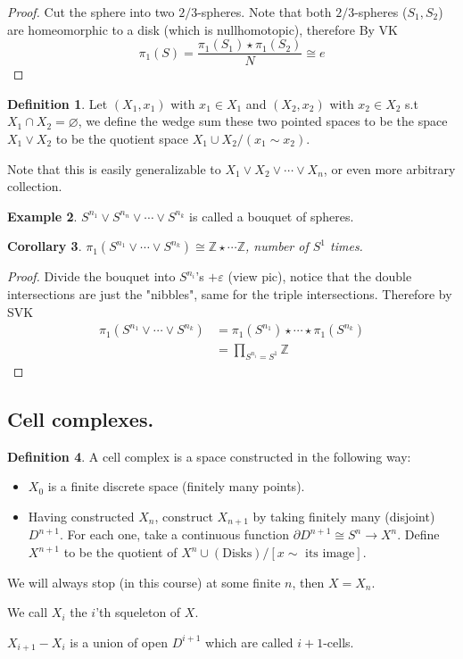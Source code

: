 \documentclass[11pt,a4paper]{article}
\theoremstyle{definition}
\newtheorem{definition}{Definition}[section]
\newtheorem{example}[definition]{Example}
\theoremstyle{plain}
\newtheorem{corollary}[definition]{Corollary}
\theoremstyle{remark}
\newcommand{\Z}{\mathbb{Z}}
\newcommand{\1}{\mathbbm{1}}
\begin{document}
\begin{proof}
    Cut the sphere into two $2/3$-spheres. Note that both $2/3$-spheres ($S_1, S_2$) are homeomorphic to a disk (which is nullhomotopic), therefore By VK 
    $$\pi_1 (S) = \frac{\pi_1(S_1) \star \pi_1(S_2)}{N} \cong e$$
\end{proof}

\begin{definition}
    Let $(X_1,x_1)$ with $x_1 \in X_1$ and $(X_2, x_2)$ with $x_2 \in X_2$ s.t $X_1 \cap X_2 = \varnothing$, we define 
    the wedge sum these two pointed spaces to be the space $X_1 \vee X_2$ to be the quotient space 
    $X_1 \cup X_2 / (x_1 \sim x_2)$. 
    
    Note that this is easily generalizable to $X_1 \vee X_2 \vee \cdots \vee X_n$, or even more arbitrary collection.
\end{definition}

\begin{example}
    $S^{n_1} \vee S^{n_n} \vee \cdots \vee S^{n_k}$ is called a bouquet of spheres. 
\end{example}

\begin{corollary}
    $\pi_1(S^{n_1} \vee \cdots \vee S^{n_k}) \cong \Z \star \cdots \Z$, number of $S^1$ times. 
\end{corollary}

\begin{proof}
    Divide the bouquet into $S^{n_i}$'s $+ \varepsilon$ (view pic), notice that the double intersections are just the "nibbles", same for the triple intersections. Therefore 
    by SVK 
    \begin{align*}
        \pi_1(S^{n_1} \vee \cdots \vee S^{n_k}) &= \pi_1(S^{n_1}) \star \cdots \star \pi_1(S^{n_k}) \\
        &= \prod_{S^{n_i} = S^1} \Z 
    \end{align*}
\end{proof} 

\subsection{Cell complexes.} 
\begin{definition}
    A cell complex is a space constructed in the following way: 
    \begin{itemize}
        \item $X_0$ is a finite discrete space (finitely many points).
        \item Having constructed $X_n$, construct $X_{n+1}$ by taking finitely many (disjoint) $D^{n+1}$.
        For each one, take a continuous function $\partial D^{n+1} \cong S^n \to X^n$. Define $X^{n+1}$ to be the 
        quotient of $X^n \cup (\text{Disks}) / [x \sim \text{ its image}]$.  
    \end{itemize}
    We will always stop (in this course) at some finite $n$, then $X = X_n$.
    
    We call $X_i$ the $i$'th squeleton of $X$. 

    $X_{i+1} - X_i$ is a union of open $D^{i+1}$ which are called $i+1$-cells. 
\end{definition}
\end{document}
